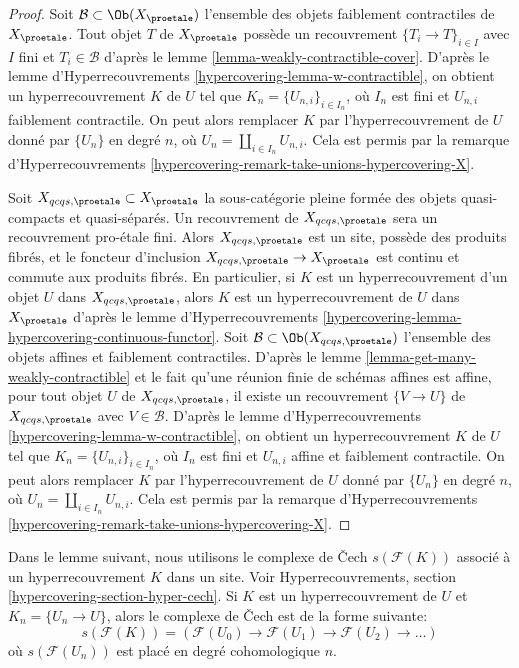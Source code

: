 \begin{proof}
Soit $\mathcal{B} \subset \Ob(X_\proetale)$ l'ensemble des objets faiblement contractiles
de $X_\proetale$. Tout objet $T$ de $X_\proetale$ possède un
recouvrement $\{T_i \to T\}_{i \in I}$ avec $I$ fini et $T_i \in \mathcal{B}$ d'après le
lemme \ref{lemma-weakly-contractible-cover}.
D'après le lemme d'Hyperrecouvrements \ref{hypercovering-lemma-w-contractible},
on obtient un hyperrecouvrement $K$ de $U$ tel que $K_n = \{U_{n, i}\}_{i \in I_n}$,
où $I_n$ est fini et $U_{n, i}$ faiblement contractile.
On peut alors remplacer $K$ par l'hyperrecouvrement de $U$ donné par $\{U_n\}$
en degré $n$, où $U_n = \coprod_{i \in I_n} U_{n, i}$.
Cela est permis par la
remarque d'Hyperrecouvrements \ref{hypercovering-remark-take-unions-hypercovering-X}.

\medskip\noindent
Soit $X_{qcqs, \proetale} \subset X_\proetale$ la sous-catégorie pleine
formée des objets quasi-compacts et quasi-séparés.
Un recouvrement de $X_{qcqs, \proetale}$ sera un recouvrement pro-\'etale fini.
Alors $X_{qcqs, \proetale}$ est un site, possède des produits fibrés, et
le foncteur d'inclusion $X_{qcqs, \proetale} \to X_\proetale$ est continu
et commute aux produits fibrés.
En particulier, si $K$ est un hyperrecouvrement d'un objet $U$ dans
$X_{qcqs, \proetale}$, alors $K$ est un hyperrecouvrement de $U$ dans $X_\proetale$
d'après le lemme d'Hyperrecouvrements
\ref{hypercovering-lemma-hypercovering-continuous-functor}.
Soit $\mathcal{B} \subset \Ob(X_{qcqs, \proetale})$ l'ensemble des objets
affines et faiblement contractiles. D'après le
lemme \ref{lemma-get-many-weakly-contractible}
et le fait qu'une réunion finie de schémas affines est affine,
pour tout objet $U$ de $X_{qcqs, \proetale}$, il existe un recouvrement
$\{V \to U\}$ de $X_{qcqs, \proetale}$ avec $V \in \mathcal{B}$.
D'après le lemme d'Hyperrecouvrements \ref{hypercovering-lemma-w-contractible},
on obtient un hyperrecouvrement $K$ de $U$ tel que $K_n = \{U_{n, i}\}_{i \in I_n}$,
où $I_n$ est fini et $U_{n, i}$ affine et faiblement contractile.
On peut alors remplacer $K$ par l'hyperrecouvrement de $U$
donné par $\{U_n\}$ en degré $n$, où
$U_n = \coprod_{i \in I_n} U_{n, i}$. Cela est permis par la
remarque d'Hyperrecouvrements \ref{hypercovering-remark-take-unions-hypercovering-X}.
\end{proof}

\noindent
Dans le lemme suivant, nous utilisons le complexe de {\v C}ech $s(\mathcal{F}(K))$
associé à un hyperrecouvrement $K$ dans un site. Voir
Hyperrecouvrements, section \ref{hypercovering-section-hyper-cech}.
Si $K$ est un hyperrecouvrement de $U$ et $K_n = \{U_n \to U\}$, alors
le complexe de {\v C}ech est de la forme suivante:
$$
s(\mathcal{F}(K)) =
\left(
\mathcal{F}(U_0) \to \mathcal{F}(U_1) \to \mathcal{F}(U_2) \to \ldots
\right)
$$
où $s(\mathcal{F}(U_n))$ est placé en degré cohomologique $n$.

